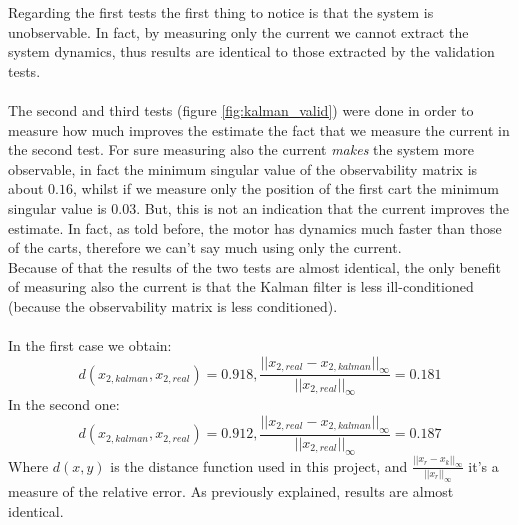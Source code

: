 Regarding the first tests the first thing to notice is that the system is unobservable. In fact, by measuring only the current we cannot extract the system dynamics, thus results are identical to those extracted by the validation tests. \\ \\
The second and third tests (figure \ref{fig:kalman_valid}) were done in order to measure how much improves the estimate the fact that we measure the current in the second test. For sure measuring also the current \emph{makes} the system more observable, in fact the minimum singular value of the observability matrix is about $0.16$, whilst if we measure only the position of the first cart the minimum singular value is $0.03$. But, this is not an indication that the current improves the estimate. In fact, as told before, the motor  has dynamics much faster than those of the carts, therefore we can't say much using only the current.\\Because of that the results of the two tests are almost identical, the only benefit of measuring also the current is that the Kalman filter is less ill-conditioned (because the observability matrix is less conditioned).\\ \\
In the first case we obtain:
$$d(x_{2,kalman},x_{2,real}) = 0.918, \frac{||x_{2,real}-x_{2,kalman}||_{\infty}}{||x_{2,real}||_{\infty}}=0.181$$
In the second one:
$$d(x_{2,kalman},x_{2,real}) = 0.912, \frac{||x_{2,real}-x_{2,kalman}||_{\infty}}{||x_{2,real}||_{\infty}}=0.187$$
Where $d(x,y)$ is the distance function used in this project, and $\frac{||x_{r}-x_{k}||_{\infty}}{||x_{r}||_{\infty}}$ it's a measure of the relative error. As previously explained, results are almost identical.
